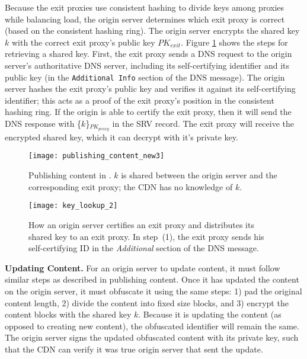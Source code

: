 Because the exit proxies use consistent hashing to divide keys among proxies while
balancing load, the origin server
determines which exit proxy is correct (based on the consistent hashing ring). 
The origin server encrypts the
shared key $k$ with the correct exit proxy's public key $PK_{exit}$.  
Figure \ref{fig:keys} shows the steps for retrieving a shared key.  First, the
exit proxy sends a DNS request to the origin server's authoritative DNS server, including its self-certifying
identifier and its public key (in the {\tt Additional Info} section of the DNS message).  The origin server hashes the exit 
proxy's public key and verifies it against its self-certifying identifier; this acts as a proof of the 
exit proxy's position in the consistent hashing ring.  If the origin is able to
certify the exit proxy, then it will send the DNS response with
\{$k$\}$_{PK_{proxy}}$ in the SRV record. The exit proxy will receive the encrypted shared key, which it can decrypt with it's private key.

\begin{figure}[t!]
\begin{minipage}[t]{.4\linewidth}
\centering
\texttt{[image: publishing\_content\_new3]}
\caption{Publishing content in \system{}.  $k$ is shared between the 
origin server and the corresponding exit proxy; the CDN has no knowledge of $k$.}
\label{fig:publishing}
\end{minipage}
\hfill
\begin{minipage}[t]{.55\linewidth}
\centering
\texttt{[image: key\_lookup\_2]}
\caption{How an origin server certifies an exit proxy and distributes its shared
key to an exit proxy.  In step~(1), 
the exit proxy sends his self-certifying ID in the {\it Additional} section of the DNS message.  }
\label{fig:keys}
\end{minipage}
\end{figure}




\textbf{Updating Content.}
For an origin server to update content, it must follow similar steps as described
in publishing content.  
Once it has updated the content on the origin server, it must obfuscate it using
the same steps: 1) pad the 
original content length, 2) divide the content into fixed size blocks, and 3) encrypt the content blocks 
with the shared key $k$.  Because it is updating the content (as opposed to creating
new content), the 
obfuscated identifier will remain the same.  The origin server signs the updated obfuscated content with 
its private key, such that the CDN can verify it was true origin server that sent
the update.

